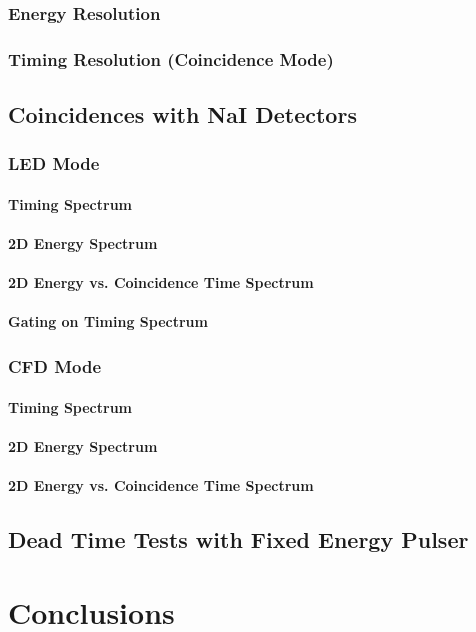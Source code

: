 \subsubsection{Energy Resolution}

\subsubsection{Timing Resolution (Coincidence Mode)}

\subsection{Coincidences with NaI Detectors}

\subsubsection{LED Mode}

\paragraph{Timing Spectrum}

\paragraph{2D Energy Spectrum}

\paragraph{2D Energy vs. Coincidence Time Spectrum}

\paragraph{Gating on Timing Spectrum}

\subsubsection{CFD Mode}

\paragraph{Timing Spectrum}

\paragraph{2D Energy Spectrum}

\paragraph{2D Energy vs. Coincidence Time Spectrum}

\subsection{Dead Time Tests with Fixed Energy Pulser}

\section{Conclusions}

